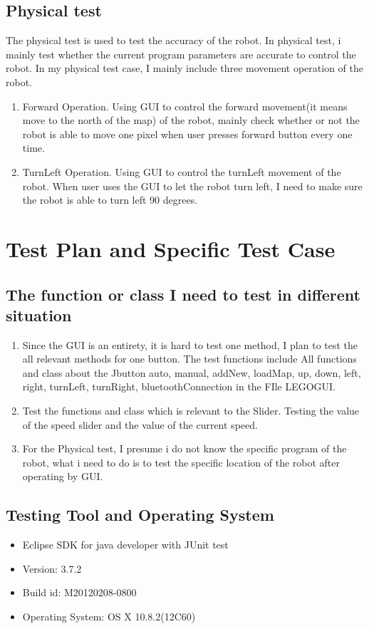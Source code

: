 \documentclass[11pt, a4paper]{report}
\begin{document}
\section{Physical test}
The physical test is used to test the accuracy of the robot. In physical test, i mainly test whether the current program parameters are accurate to control the robot. In my physical test case, I mainly include three movement operation of the robot.  
\begin{enumerate}
\item Forward Operation. Using GUI to control the forward movement(it means move to the north of the map) of the robot, mainly check whether or not the robot is able to move one pixel when user presses forward button every one time.
\item TurnLeft Operation. Using GUI to control the turnLeft movement of the robot. When user uses the GUI to let the robot turn left, I need to make sure the robot is able to turn left 90 degrees. 
\end{enumerate}
\chapter{Test Plan and Specific Test Case}
\section{The function or class I need to test in different situation}
\begin{enumerate}
\item Since the GUI is an entirety, it is hard to test one method, I plan to test the all relevant methods for one button.  The test functions include All functions and class about the Jbutton auto, manual, addNew, loadMap, up, down, left, right, turnLeft, turnRight, bluetoothConnection in the FIle LEGOGUI.  
\item Test the functions and class which is relevant to the Slider. Testing the value of the speed slider and the value of the current speed.
\item For the Physical test, I presume i do not know the specific program of the robot, what i need to do is to test the specific location of the robot after operating by GUI. 
\end{enumerate}
\section{Testing Tool and Operating System}
\begin{itemize}
\item Eclipse SDK for java developer with JUnit test
\item Version: 3.7.2
\item Build id: M20120208-0800
\item Operating System: OS X 10.8.2(12C60)
\end{itemize}
\end{document}
